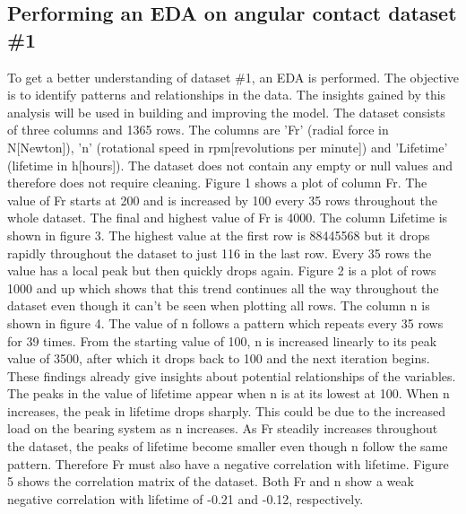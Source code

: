 \documentclass[letterpaper,10pt]{article}
\begin{document}
	\subsection{Performing an EDA on  angular contact dataset \#1}
	To get a better understanding of dataset \#1, an EDA is performed. The objective is to identify patterns and relationships in the data. The insights gained by this analysis will be used in building and improving the model.
	\newline The dataset consists of three columns and 1365 rows. The columns are 'Fr' (radial force in N[Newton]), 'n' (rotational speed in rpm[revolutions per minute]) and 'Lifetime' (lifetime in h[hours]). The dataset does not contain any empty or null values and therefore does not require cleaning.
	\newline Figure 1 shows a plot of column Fr. The value of Fr starts at 200 and is increased by 100 every 35 rows throughout the whole dataset. The final and highest value of Fr is 4000. 
	\newline The column Lifetime is shown in figure 3. The highest value at the first row is 88445568 but it drops rapidly throughout the dataset to just 116 in the last row. Every 35 rows the value has a local peak but then quickly drops again. Figure 2 is a plot of rows 1000 and up which shows that this trend continues all the way throughout the dataset even though it can't be seen when plotting all rows. 
	\newline The column n is shown in figure 4. The value of n follows a pattern which repeats every 35 rows for 39 times. From the starting value of 100, n is  increased linearly to its peak value of 3500, after which it drops back to 100 and the next iteration begins. 
	\newline These findings already give insights about potential relationships of the variables. The peaks in the value of lifetime appear when n is at its lowest at 100. When n increases, the peak in lifetime drops sharply. This could be due to the increased load on the bearing system as n increases. As Fr steadily increases throughout the dataset, the peaks of lifetime become smaller even though n follow the same pattern. Therefore Fr must also have a negative correlation with lifetime.
	\newline Figure 5 shows the correlation matrix of the dataset. Both Fr and n show a weak negative correlation with lifetime of -0.21 and -0.12, respectively. 
	
\end{document}
